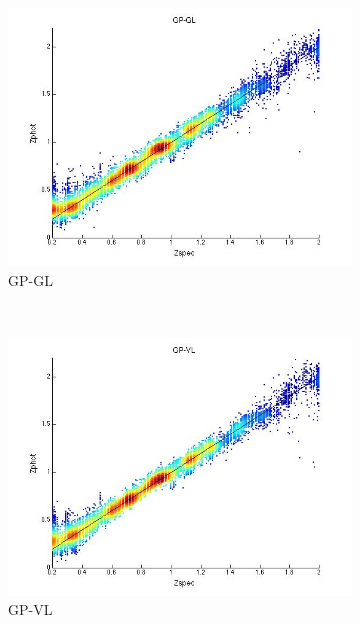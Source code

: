 \documentclass[useAMS,usenatbib,fleqn]{mn2e}
\begin{document}
\begin{figure}
\begin{subfigure}[b]{110px}
                \includegraphics[trim = 35px 15px 50px 25px, clip=true,width=\textwidth]{GPGL.jpg}
                \caption{GP-GL}
        \end{subfigure}
        ~
        \begin{subfigure}[b]{110px}
                \includegraphics[trim = 35px 15px 50px 25px, clip=true,width=\textwidth]{GPVL.jpg}
                \caption{GP-VL}
        \end{subfigure}
        ~
        \begin{subfigure}[b]{110px}

\end{subfigure}
\end{figure}
\end{document}
